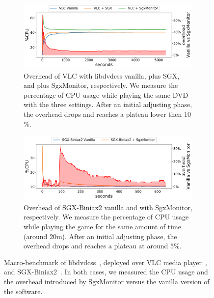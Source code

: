 \begin{figure}[t]
	\centering
	\begin{subfigure}[t]{0.49\textwidth}
		\centering
		\includegraphics[width=\textwidth]{fig_c6/vlc_performance.pdf}
		\caption{Overhead of VLC with \textsf{libdvdcss} vanilla, plus SGX, and 
			plus SgxMonitor, respectively. We measure the percentage of CPU 
			usage 
			while playing the same DVD with the three settings.
			After an initial adjusting phase, the overhead drops and reaches a 
			plateau lower then $10$\%.}
		\label{fig:vlc_performance}
	\end{subfigure}
	\hfill
	\begin{subfigure}[t]{0.49\textwidth}
		\centering
		\includegraphics[width=\textwidth]{fig_c6/biniax2_performance.pdf}
		\caption{Overhead of \textsf{SGX-Biniax2} vanilla and with 
			SgxMonitor, 
			respectively. We measure the percentage of CPU usage while playing 
			the 
			game for the same amount of time (around $20$m).
			After an initial adjusting phase, the overhead drops and reaches a  
			plateau at around $5$\%.}
		\label{fig:biniax2_performance}
	\end{subfigure}
	\caption[SgxMonitor \textsf{libdvdcss} and \textsf{SGX-Biniax2}
	macro-benchmark.]{Macro-benchmark of \textsf{libdvdcss}~\citep{libdvdcss}, 
	deployed over VLC media player~\citep{videolan}, and 		
	\textsf{SGX-Biniax2}~\citep{bauman2016case}. In both cases, we measured the 
	CPU usage and the overhead introduced by SgxMonitor versus the vanilla 
	version of the software.}
	\label{fig:vlc_biniax2_performance}
\end{figure}

